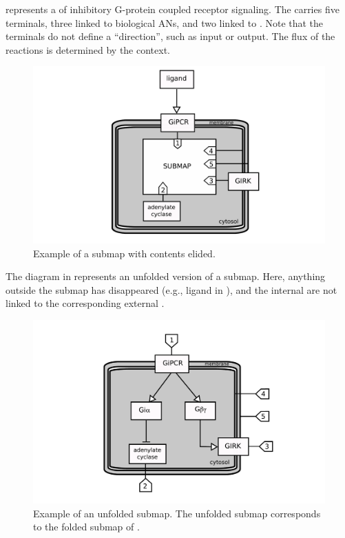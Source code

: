  represents a  of inhibitory G-protein coupled receptor signaling. The  carries five terminals, three linked to biological ANs, and two linked to .  Note that the terminals do not define a ``direction'', such as input or output.  The flux of the reactions is determined by the context.

\begin{figure}[H]
  \centering
  \includegraphics[scale = 0.5]{examples/submap-folded}
  \caption{Example of a submap with contents elided.}
  \label{fig:submap-folded}
\end{figure}

The diagram in  represents an unfolded version of a submap.  Here, anything outside the submap has disappeared (e.g., ligand in ), and the internal  are not linked to the corresponding external .

\begin{figure}[H]
  \centering
  \includegraphics[scale = 0.5]{examples/submap-dissociated}
  \caption{Example of an unfolded submap. The unfolded submap corresponds to the folded submap of .}
  \label{fig:submap-unfolded}
\end{figure}
